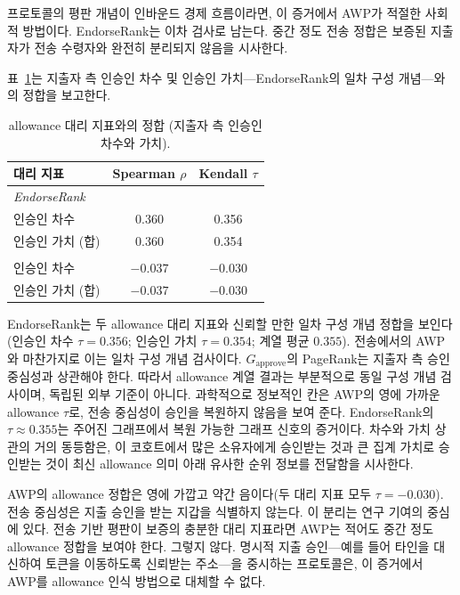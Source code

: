 프로토콜의 평판 개념이 인바운드 경제 흐름이라면, 이 증거에서 AWP가 적절한 사회적 방법이다. EndorseRank는 이차 검사로 남는다. 중간 정도 전송 정합은 보증된 지출자가 전송 수령자와 완전히 분리되지 않음을 시사한다.


표~\ref{tab:alignment-allowance}는 지출자 측 인승인 차수 및 인승인 가치---EndorseRank의 일차 구성 개념---와의 정합을 보고한다.

\begin{table}[htbp]
\centering
\caption{allowance 대리 지표와의 정합 (지출자 측 인승인 차수와 가치).}
\label{tab:alignment-allowance}
\begin{tabular}{lcc}
\toprule
대리 지표 & Spearman $\rho$ & Kendall $\tau$ \\
\midrule
\multicolumn{3}{l}{\textit{EndorseRank}} \\
인승인 차수 & 0.360 & 0.356 \\
인승인 가치 (합) & 0.360 & 0.354 \\
\addlinespace
\multicolumn{3}{l}{\textit{AWP}} \\
인승인 차수 & $-0.037$ & $-0.030$ \\
인승인 가치 (합) & $-0.037$ & $-0.030$ \\
\bottomrule
\end{tabular}
\end{table}

EndorseRank는 두 allowance 대리 지표와 신뢰할 만한 일차 구성 개념 정합을 보인다(인승인 차수 $\tau=0.356$; 인승인 가치 $\tau=0.354$; 계열 평균 $0.355$). 전송에서의 AWP와 마찬가지로 이는 일차 구성 개념 검사이다. $G_{\text{approve}}$의 PageRank는 지출자 측 승인 중심성과 상관해야 한다. 따라서 allowance 계열 결과는 부분적으로 동일 구성 개념 검사이며, 독립된 외부 기준이 아니다. 과학적으로 정보적인 칸은 AWP의 영에 가까운 allowance $\tau$로, 전송 중심성이 승인을 복원하지 않음을 보여 준다. EndorseRank의 $\tau \approx 0.355$는 주어진 그래프에서 복원 가능한 그래프 신호의 증거이다. 차수와 가치 상관의 거의 동등함은, 이 코호트에서 많은 소유자에게 승인받는 것과 큰 집계 가치로 승인받는 것이 최신 allowance 의미 아래 유사한 순위 정보를 전달함을 시사한다.

AWP의 allowance 정합은 영에 가깝고 약간 음이다(두 대리 지표 모두 $\tau=-0.030$). 전송 중심성은 지출 승인을 받는 지갑을 식별하지 않는다. 이 분리는 연구 기여의 중심에 있다. 전송 기반 평판이 보증의 충분한 대리 지표라면 AWP는 적어도 중간 정도 allowance 정합을 보여야 한다. 그렇지 않다. 명시적 지출 승인---예를 들어 타인을 대신하여 토큰을 이동하도록 신뢰받는 주소---을 중시하는 프로토콜은, 이 증거에서 AWP를 allowance 인식 방법으로 대체할 수 없다.

